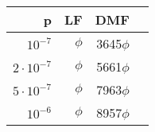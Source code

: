 \begin{tabular}{r|rrr}
p & LF & DMF \\
\hline
$10^{-7}$ & $\phi$& 3645$\phi$\\
$2\cdot10^{-7}$ &  $\phi$ & 5661$\phi$\\
$5\cdot10^{-7}$ &  $\phi$ & 7963$\phi$\\
$10^{-6}$ &  $\phi$ & 8957$\phi$\\
\end{tabular}